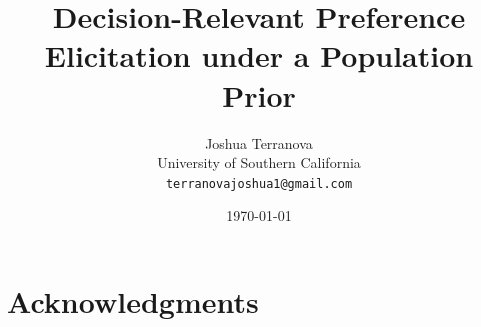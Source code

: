 \documentclass[11pt,a4paper]{article}
\title{Decision-Relevant Preference Elicitation under a Population Prior}
\author{
  Joshua Terranova\\
  University of Southern California\\
  \texttt{terranovajoshua1@gmail.com}
}
\date{\today}
\begin{document}
\maketitle

\begin{abstract}

\end{abstract}

\tableofcontents
\newpage









\section*{Acknowledgments}




\appendix

\end{document}
